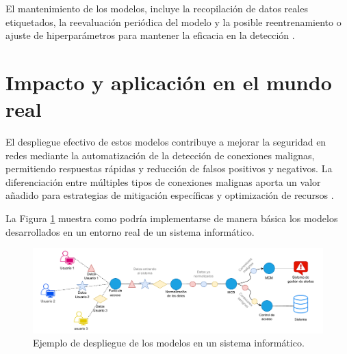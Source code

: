 El mantenimiento de los modelos, incluye la recopilación de datos reales etiquetados, la reevaluación periódica del modelo y la posible reentrenamiento o ajuste de hiperparámetros para mantener la eficacia en la detección \cite{tsymbal2004problem}.

\section{Impacto y aplicación en el mundo real}

El despliegue efectivo de estos modelos contribuye a mejorar la seguridad en redes mediante la automatización de la detección de conexiones malignas, permitiendo respuestas rápidas y reducción de falsos positivos y negativos. La diferenciación entre múltiples tipos de conexiones malignas aporta un valor añadido para estrategias de mitigación específicas y optimización de recursos \cite{amershi2019software}.

La Figura \ref{fig:despliegue} muestra como podría implementarse de manera básica los modelos desarrollados en un entorno real de un sistema informático.

\begin{figure}[H]
    \centering
    \includegraphics[width=1\textwidth]{./img/despliegue/despliegue.pdf}
    \caption{Ejemplo de despliegue de los modelos en un sistema informático.}
    \label{fig:despliegue}
\end{figure}
